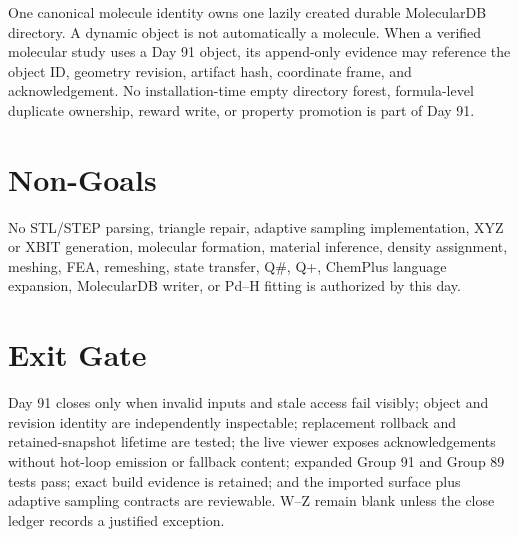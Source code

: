 \documentclass[10pt]{article}
\begin{document}
One canonical molecule identity owns one lazily created durable MolecularDB
directory. A dynamic object is not automatically a molecule. When a verified
molecular study uses a Day 91 object, its append-only evidence may reference
the object ID, geometry revision, artifact hash, coordinate frame, and
acknowledgement. No installation-time empty directory forest, formula-level
duplicate ownership, reward write, or property promotion is part of Day 91.

\section*{Non-Goals}

No STL/STEP parsing, triangle repair, adaptive sampling implementation, XYZ or
XBIT generation, molecular formation, material inference, density assignment,
meshing, FEA, remeshing, state transfer, Q\#, Q+, ChemPlus language expansion,
MolecularDB writer, or Pd--H fitting is authorized by this day.

\section*{Exit Gate}

Day 91 closes only when invalid inputs and stale access fail visibly; object and
revision identity are independently inspectable; replacement rollback and
retained-snapshot lifetime are tested; the live viewer exposes
acknowledgements without hot-loop emission or fallback content; expanded Group
91 and Group 89 tests pass; exact build evidence is retained; and the imported
surface plus adaptive sampling contracts are reviewable. W--Z remain blank
unless the close ledger records a justified exception.
\end{document}
